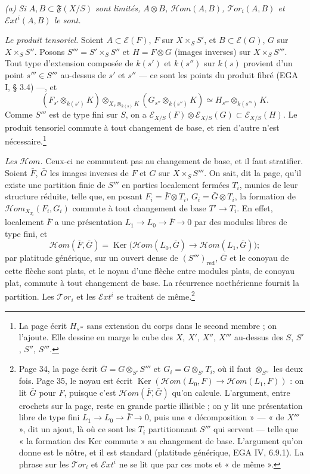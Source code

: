 \documentclass[11pt,a4paper]{article}
\begin{document}
\emph{(a) Si $A, B \subset \mathfrak{F}(X/S)$ sont limités, $A \otimes B$,
$\mathcal{H}om(A, B)$, $\mathcal{T}or_i(A, B)$ et $\mathcal{E}xt^{i}(A, B)$
le sont.}

\emph{Le produit tensoriel.} Soient $A \subset \mathcal{E}(F)$, $F$ sur
$X \times_S S'$, et $B \subset \mathcal{E}(G)$, $G$ sur $X \times_S S''$.
Posons $S''' = S' \times_S S''$ et $H = F \otimes G$ (images inverses) sur
$X \times_S S'''$. Tout type d'extension composée de $k(s')$ et $k(s'')$ sur
$k(s)$ provient d'un point $s''' \in S'''$ au-dessus de $s'$ et $s''$ --- ce
sont les points du produit fibré (EGA I, § 3.4) ---, et
\[
  (F_{s'} \otimes_{k(s')} K) \otimes_{X_{s} \otimes_{k(s)} K}
  (G_{s''} \otimes_{k(s'')} K) \simeq H_{s'''} \otimes_{k(s''')} K .
\]
Comme $S'''$ est de type fini sur $S$, on a
$\mathcal{E}_{X/S}(F) \otimes \mathcal{E}_{X/S}(G) \subset
\mathcal{E}_{X/S}(H)$. Le produit tensoriel commute à tout changement de
base, et rien d'autre n'est nécessaire.\footnote{La page écrit $H_{s'''}$
sans extension du corps dans le second membre ; on l'ajoute. Elle dessine
en marge le cube des $X$, $X'$, $X''$, $X'''$ au-dessus des $S$, $S'$,
$S''$, $S'''$.}

\emph{Les $\mathcal{H}om$.} Ceux-ci ne commutent pas au changement de base,
et il faut stratifier. Soient $\bar{F}$, $\bar{G}$ les images inverses de $F$
et $G$ sur $X \times_S S'''$. On sait, dit la page, qu'il existe une
partition finie de $S'''$ en
parties localement fermées $T_i$, munies de leur structure réduite, telle
que, en posant $F_i = \bar{F} \otimes T_i$, $G_i = \bar{G} \otimes T_i$, la
formation de $\mathcal{H}om_{X_{T_i}}(F_i, G_i)$ commute à tout changement
de base $T' \to T_i$. En effet, localement $\bar{F}$ a une présentation
$L_1 \to L_0 \to \bar{F} \to 0$ par des modules libres de type fini, et
\[
  \mathcal{H}om(\bar{F}, \bar{G}) =
  \operatorname{Ker}\bigl(\mathcal{H}om(L_0, \bar{G}) \to
  \mathcal{H}om(L_1, \bar{G})\bigr) ;
\]
par platitude générique, sur un ouvert dense de $(S''')_{\mathrm{red}}$,
$\bar{G}$ et le conoyau de cette flèche sont plats, et le noyau d'une flèche
entre modules plats, de conoyau plat, commute à tout changement de base. La
récurrence noethérienne fournit la partition. Les $\mathcal{T}or_i$ et les
$\mathcal{E}xt^{i}$ se traitent de même.\footnote{Page 34, la page écrit
$\bar{G} = G \otimes_{S'} S'''$ et $G_i = G \otimes_{S'} T_i$, où il faut
$\otimes_{S''}$ les deux fois. Page 35, le noyau est écrit
$\operatorname{Ker}(\mathcal{H}om(L_0, F) \to \mathcal{H}om(L_1, F))$ : on
lit $\bar{G}$ pour $F$, puisque c'est $\mathcal{H}om(\bar{F}, \bar{G})$
qu'on calcule. L'argument, entre crochets sur la page, reste en grande
partie illisible ; on y lit une présentation libre de type fini
$L_1 \to L_0 \to \bar{F} \to 0$, puis une « décomposition » --- « de
$X'''$ », dit un ajout, là où ce sont les $T_i$ partitionnant $S'''$ qui
servent --- telle que « la formation des Ker commute » au changement de
base. L'argument qu'on donne est le nôtre, et il est standard (platitude
générique, EGA IV, 6.9.1). La phrase sur les $\mathcal{T}or_i$ et
$\mathcal{E}xt^{i}$ ne se lit que par ces mots et « de même ».}
\end{document}
